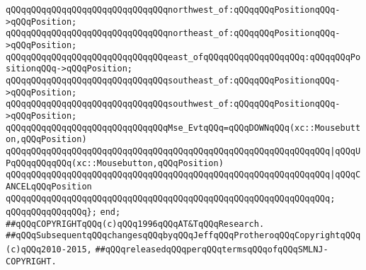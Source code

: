 \verb|qQQqqQQqqQQqqQQqqQQqqQQqqQQqqQQqnorthwest_of:qQQqqQQqPositionqQQq->qQQqPosition;|\newline
\verb|qQQqqQQqqQQqqQQqqQQqqQQqqQQqqQQqnortheast_of:qQQqqQQqPositionqQQq->qQQqPosition;|\newline
\verb|qQQqqQQqqQQqqQQqqQQqqQQqqQQqqQQqeast_ofqQQqqQQqqQQqqQQqqQQq:qQQqqQQqPositionqQQq->qQQqPosition;|\newline
\verb|qQQqqQQqqQQqqQQqqQQqqQQqqQQqqQQqsoutheast_of:qQQqqQQqPositionqQQq->qQQqPosition;|\newline
\verb|qQQqqQQqqQQqqQQqqQQqqQQqqQQqqQQqsouthwest_of:qQQqqQQqPositionqQQq->qQQqPosition;|\newline
\newline
\verb|qQQqqQQqqQQqqQQqqQQqqQQqqQQqqQQqMse_EvtqQQq=qQQqDOWNqQQq(xc::Mousebutton,qQQqPosition)|\newline
\verb|qQQqqQQqqQQqqQQqqQQqqQQqqQQqqQQqqQQqqQQqqQQqqQQqqQQqqQQqqQQqqQQq|\verb#|qQQqUPqQQqqQQqqQQq(xc::Mousebutton,qQQqPosition)#\newline
\verb|qQQqqQQqqQQqqQQqqQQqqQQqqQQqqQQqqQQqqQQqqQQqqQQqqQQqqQQqqQQqqQQq|\verb#|qQQqCANCELqQQqPosition#\newline
\verb|qQQqqQQqqQQqqQQqqQQqqQQqqQQqqQQqqQQqqQQqqQQqqQQqqQQqqQQqqQQqqQQq;|\newline
\verb|qQQqqQQqqQQqqQQq};|\newline
\verb|end;|\newline
\newline
\newline
\verb|##qQQqCOPYRIGHTqQQq(c)qQQq1996qQQqAT&TqQQqResearch.|\newline
\verb|##qQQqSubsequentqQQqchangesqQQqbyqQQqJeffqQQqProtheroqQQqCopyrightqQQq(c)qQQq2010-2015,|\newline
\verb|##qQQqreleasedqQQqperqQQqtermsqQQqofqQQqSMLNJ-COPYRIGHT.|\newline


